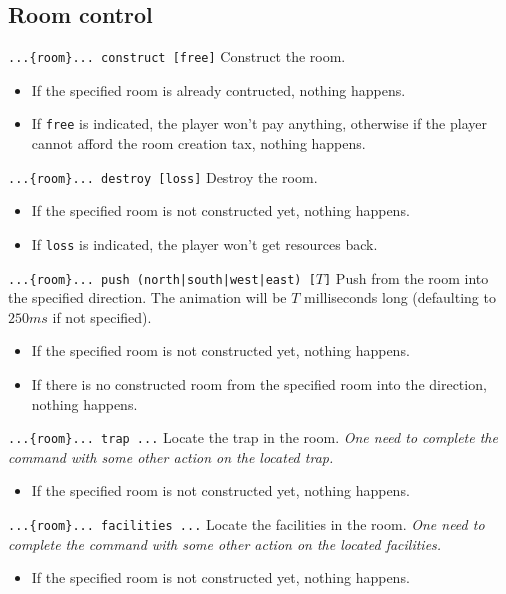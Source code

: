 \documentclass[10pt,a4paper]{scrartcl}
\newenvironment{apiCode}[1]
{ \begin{lrbox}{\mybox} \begin{minipage}{0.9\textwidth} {\color{Mahogany} \small\texttt{#1}} \vspace{8pt} \newline }
{ \end{minipage} \end{lrbox}\fbox{\usebox{\mybox}} \newline\vspace{4pt}\newline }
\begin{document}
\subsection{Room control}
\begin{apiCode}{...\{room\}... construct [free]}
Construct the room.
\begin{itemize}
\itemsep 0em
\item If the specified room is already contructed, nothing happens.
\item If \verb#free# is indicated, the player won't pay anything,\newline
	  otherwise if the player cannot afford the room creation tax, nothing happens.
\end{itemize}
\end{apiCode}
\begin{apiCode}{...\{room\}... destroy [loss]}
Destroy the room.
\begin{itemize}
\itemsep 0em
\item If the specified room is not constructed yet, nothing happens.
\item If \verb#loss# is indicated, the player won't get resources back.
\end{itemize}
\end{apiCode}
\begin{apiCode}{...\{room\}... push (north|south|west|east) [$T$]}
Push from the room into the specified direction.\newline
The animation will be $T$ milliseconds long (defaulting to $250ms$ if not specified).
\begin{itemize}
\itemsep 0em
\item If the specified room is not constructed yet, nothing happens.
\item If there is no constructed room from the specified room\newline
	  into the direction, nothing happens.
\end{itemize}
\end{apiCode}
\begin{apiCode}{...\{room\}... trap ...}
Locate the trap in the room.\newline
\textit{One need to complete the command with some other action on the located trap.}
\begin{itemize}
\itemsep 0em
\item If the specified room is not constructed yet, nothing happens.
\end{itemize}
\end{apiCode}
\begin{apiCode}{...\{room\}... facilities ...}
Locate the facilities in the room.\newline
\textit{One need to complete the command with some other action on the located facilities.}
\begin{itemize}
\itemsep 0em
\item If the specified room is not constructed yet, nothing happens.
\end{itemize}
\end{apiCode}
\end{document}
